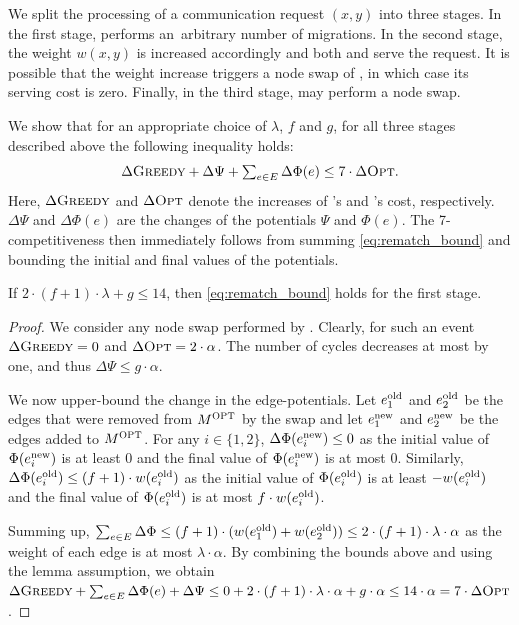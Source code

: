 We split the processing of a communication request $(x,y)$ into three stages. In
the first stage, \OPT performs an~arbitrary number of migrations. In the
second stage, the weight $w(x,y)$ is increased accordingly and both \OPT and
\GREEDY serve the request. It is possible that the weight increase triggers a
node swap of \GREEDY, in which case its serving cost is zero. Finally, in the
third stage, \GREEDY may perform a node swap.

We show that for an appropriate choice of $\lambda$, $f$ and $g$, for all
three stages described above the following inequality holds:
\begin{equation}
\label{eq:rematch_bound}
	\textstyle \Delta \textsc{Greedy} + \Delta \Psi + \sum_{e \in E} \Delta \Phi(e) \leq 7 \cdot \Delta \textsc{Opt}.
\end{equation}
Here, $\Delta \textsc{Greedy}$ and $\Delta \textsc{Opt}$ denote the increases of \GREEDY's and
\OPT's cost, respectively. $\Delta \Psi$ and $\Delta \Phi(e)$ are the changes
of the potentials $\Psi$ and $\Phi(e)$. The 7-competitiveness then immediately
follows from summing \eqref{eq:rematch_bound} and bounding the initial and
final values of the potentials. 

\begin{lemma}
\label{lem:opt_swap}
If $2 \cdot (f+1) \cdot \lambda + g \leq 14$, then \eqref{eq:rematch_bound}
holds for the first stage.
\end{lemma}

\begin{proof}
We consider any node swap performed by \OPT. Clearly, for such an event
$\Delta \textsc{Greedy} = 0$ and $\Delta \textsc{Opt} = 2 \cdot \alpha$. The number of cycles
decreases at most by one, and thus $\Delta \Psi \leq g \cdot \alpha$.

We now upper-bound the change in the edge-potentials. Let $e^\textrm{old}_1$ and
$e^\textrm{old}_2$ be the edges that were removed from $M^\textsc{OPT}$ by the swap and let
$e^\textrm{new}_1$ and $e^\textrm{new}_2$ be the edges added to $M^\textsc{OPT}$. For any $i \in
\{1,2\}$, $\Delta \Phi(e^\textrm{new}_i) \leq 0$ as the initial value of
$\Phi(e^\textrm{new}_i)$ is at least $0$ and the final value of $\Phi(e^\textrm{new}_i)$ is at
most $0$. Similarly, $\Delta \Phi(e^\textrm{old}_i) \leq (f+1) \cdot w(e^\textrm{old}_i)$ as the
initial value of $\Phi(e^\textrm{old}_i)$ is at least $-w(e^\textrm{old}_i)$ and the final value
of $\Phi(e^\textrm{old}_i)$ is at most $f \cdot w(e^\textrm{old}_i)$.

Summing up, $\sum_{e \in E} \Delta \Phi \leq (f+1) \cdot (w(e^\textrm{old}_1) +
w(e^\textrm{old}_2)) \leq 2 \cdot (f+1) \cdot \lambda \cdot \alpha$ as the weight of each edge
is at most $\lambda \cdot \alpha$. By combining the bounds above and using the
lemma assumption, we obtain $\Delta \textsc{Greedy} + \sum_{e \in E} \Delta \Phi(e) +
\Delta \Psi \leq 0 + 2 \cdot (f+1) \cdot \lambda \cdot \alpha + g \cdot \alpha 
\leq 14 \cdot \alpha = 7 \cdot \Delta \textsc{Opt}$.
\end{proof}


